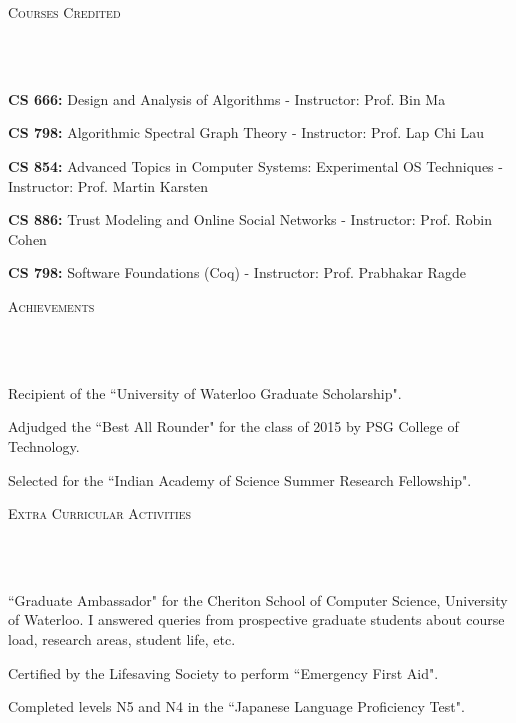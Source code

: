 \documentclass{article}
\newcommand{\header}[1]{{
\hspace*{-15pt}\vspace*{6pt} \textsc{#1}} \vspace*{-6pt} 
\lineunder
}
\newcommand{\lineunder}{
\vspace*{-8pt} \\ \hspace*{-18pt} 
\hrulefill \\
}
\renewcommand{\labelitemii}{
$\vcenter{\hbox{\tiny$\bullet$}}$\hspace*{-3pt}
}
\newenvironment{bullet-list-major}{
\begin{list}{\labelitemii}{\setlength\leftmargin{3pt} 
\topsep 0pt \itemsep -2pt}}{\vspace*{4pt}\end{list}
}
\begin{document}
\vspace*{4pt}%
\header{Courses Credited}
    \begin{bullet-list-major}
    \item \textbf{CS 666:} Design and Analysis of Algorithms - Instructor: Prof.
        Bin Ma
    \item \textbf{CS 798:} Algorithmic Spectral Graph Theory - Instructor: Prof.
        Lap Chi Lau
    \item \textbf{CS 854:} Advanced Topics in Computer Systems: Experimental OS
        Techniques - Instructor: Prof. Martin Karsten
    \item \textbf{CS 886:} Trust Modeling and Online Social Networks -
        Instructor: Prof. Robin Cohen
    \item \textbf{CS 798:} Software Foundations (Coq) - Instructor: Prof.
        Prabhakar Ragde
    \end{bullet-list-major}

\newpage
\vspace*{-20pt}

\vspace*{4pt}%
\header{Achievements}
    \begin{bullet-list-major}
    \item Recipient of the ``University of Waterloo Graduate Scholarship".
    \item Adjudged the ``Best All Rounder" for the class of 2015 by PSG College of
        Technology. 
    \item Selected for the ``Indian Academy of Science Summer Research Fellowship".
    \end{bullet-list-major}

\vspace*{4pt}%
\header{Extra Curricular Activities}
    \begin{bullet-list-major}
    \item ``Graduate Ambassador" for the Cheriton School of Computer Science,
        University of Waterloo. I answered queries from prospective graduate
        students about course load, research areas, student life, etc.
    \item Certified by the Lifesaving Society to perform ``Emergency First Aid".
    \item Completed levels N5 and N4 in the ``Japanese Language Proficiency Test".
    \end{bullet-list-major}
\end{document}

